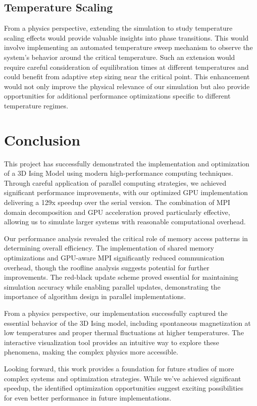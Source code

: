 \documentclass{article}
\begin{document}
\subsection{Temperature Scaling}
From a physics perspective, extending the simulation to study temperature scaling effects would provide valuable insights into phase transitions. This would involve implementing an automated temperature sweep mechanism to observe the system's behavior around the critical temperature. Such an extension would require careful consideration of equilibration times at different temperatures and could benefit from adaptive step sizing near the critical point. This enhancement would not only improve the physical relevance of our simulation but also provide opportunities for additional performance optimizations specific to different temperature regimes.

\section{Conclusion}
This project has successfully demonstrated the implementation and optimization of a 3D Ising Model using modern high-performance computing techniques. Through careful application of parallel computing strategies, we achieved significant performance improvements, with our optimized GPU implementation delivering a 129x speedup over the serial version. The combination of MPI domain decomposition and GPU acceleration proved particularly effective, allowing us to simulate larger systems with reasonable computational overhead.

Our performance analysis revealed the critical role of memory access patterns in determining overall efficiency. The implementation of shared memory optimizations and GPU-aware MPI significantly reduced communication overhead, though the roofline analysis suggests potential for further improvements. The red-black update scheme proved essential for maintaining simulation accuracy while enabling parallel updates, demonstrating the importance of algorithm design in parallel implementations.

From a physics perspective, our implementation successfully captured the essential behavior of the 3D Ising model, including spontaneous magnetization at low temperatures and proper thermal fluctuations at higher temperatures. The interactive visualization tool provides an intuitive way to explore these phenomena, making the complex physics more accessible.

Looking forward, this work provides a foundation for future studies of more complex systems and optimization strategies. While we've achieved significant speedup, the identified optimization opportunities suggest exciting possibilities for even better performance in future implementations.
\end{document}
